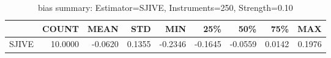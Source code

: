\begin{table}[ht]
\centering
\caption{bias summary: Estimator=SJIVE, Instruments=250, Strength=0.10}
\begin{tabular}{lrrrrrrrr}
\toprule
 & COUNT & MEAN & STD & MIN & 25\% & 50\% & 75\% & MAX \\
\midrule
SJIVE & 10.0000 & -0.0620 & 0.1355 & -0.2346 & -0.1645 & -0.0559 & 0.0142 & 0.1976 \\
\bottomrule
\end{tabular}
\end{table}
